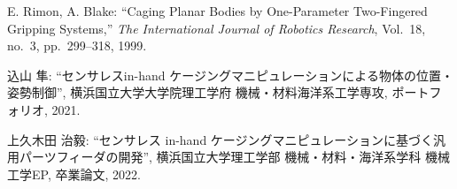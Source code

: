 \documentclass[a4paper,papersize,dvipdfmx]{mtabst}
\begin{document}
\begin{thebibliography}{9}
E. Rimon, A. Blake:
``Caging Planar Bodies by One-Parameter Two-Fingered Gripping Systems,''
{\it The International Journal of Robotics Research}, Vol.~18, no.~3, pp.~299--318, 1999.

込山 隼:
``センサレスin-hand ケージングマニピュレーションによる物体の位置・姿勢制御'',
横浜国立大学大学院理工学府 機械・材料海洋系工学専攻, ポートフォリオ, 2021.

上久木田 治毅:
``センサレス in-hand ケージングマニピュレーションに基づく汎用パーツフィーダの開発'', 
横浜国立大学理工学部 機械・材料・海洋系学科 機械工学EP, 卒業論文, 2022.

%  	

\end{thebibliography}
\end{document}
